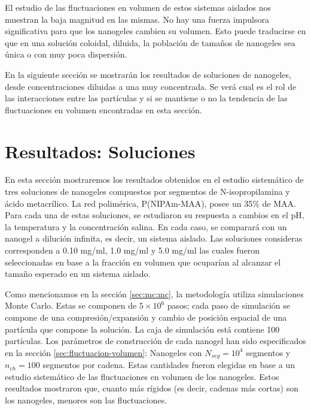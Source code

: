 	
	El estudio de las fluctuaciones en volumen de estos sistemas aislados nos muestran la baja magnitud en las mismas. No hay una fuerza impulsora significativa para que los nanogeles cambien su volumen. Esto puede traducirse en que en una soluci\'on coloidal, diluida, la poblaci\'on de tama\~nos de nanogeles sea \'unica o con muy poca dispersi\'on. 
	
	En la siguiente secci\'on se mostrar\'an los resultados de soluciones de nanogeles, desde concentraciones diluidas a una muy concentrada.
	Se ver\'a cual es el rol de las interacciones entre las part\'iculas y si se mantiene o no la tendencia de las fluctuaciones en volumen encontradas en esta secci\'on.
	
	\section{Resultados: Soluciones}
	
	En esta secci\'on mostraremos los resultados obtenidos en el estudio sistem\'atico de tres soluciones de nanogeles compuestos por segmentos de N-isopropilamina y \'acido metacr\'ilico. La red polim\'erica, P(NIPAm-MAA), posee un 35\% de MAA. Para cada una de estas soluciones, se estudiaron su respuesta a cambios en el pH, la temperatura y la concentraci\'on salina. En cada caso, se comparar\'a con un nanogel a diluci\'on infinita, es decir, un sistema aislado. Las soluciones consideras corresponden a 0.10 mg/ml, 1.0 mg/ml y 5.0 mg/ml las cuales fueron seleccionadas en base a la fracci\'on en volumen que ocupar\'ian al alcanzar el tama\~no esperado en un sistema aislado.
	
	Como mencionamos en la secci\'on \ref{sec:mc:mc}, la metodolog\'ia utiliza simulaciones Monte Carlo. Estas se componen de $5\times 10^6$ pasos; cada paso de simulaci\'on se compone de una compresi\'on/expansi\'on y cambio de posici\'on espacial de una part\'icula que compone la soluci\'on. La caja de simulaci\'on est\'a contiene 100 part\'iculas. Los par\'ametros de construcci\'on de cada nanogel han sido especificados en la secci\'on \ref{sec:fluctuacion-volumen}: Nanogeles con $N_{seg} = 10^4$ segmentos y $n_{ch} = 100$ segmentos por cadena. Estas cantidades fueron elegidas en base a un estudio sistem\'atico de las fluctuaciones en volumen de los nanogeles. Estos resultados mostraron que, cuanto m\'as r\'igidos (es decir, cadenas m\'as cortas) son los nanogeles, menores son las fluctuaciones. %
	
